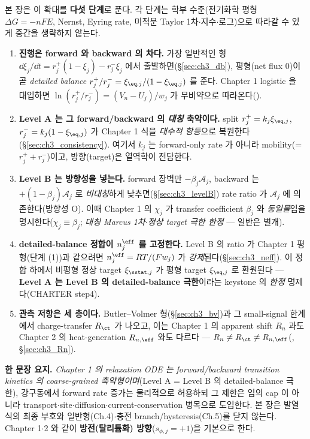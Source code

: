본 장은 이 확대를 \textbf{다섯 단계}로 푼다. 각 단계는 학부 수준(전기화학 평형 $\Delta G=-nF E$, Nernst,
Eyring rate, 미적분 Taylor 1차$\cdot$지수$\cdot$로그)으로 따라갈 수 있게 중간을 생략하지 않는다.
\begin{enumerate}[label=\textbf{(\arabic*)},leftmargin=2.2em]
\item \textbf{진행은 forward 와 backward 의 차다.} 가장 일반적인 형 $\dd\xi_j/\dd t=r_j^+(1-\xi_j)-r_j^-\xi_j$
  에서 출발하면(\S\ref{sec:ch3_db}), 평형(net flux $0$)이 곧 \emph{detailed balance} $r_j^+/r_j^-=\xi_{\eq,j}/(1-\xi_{\eq,j})$
  를 준다. Chapter 1 logistic 을 대입하면 $\ln(r_j^+/r_j^-)=(V_n-U_j)/w_j$ 가 무비약으로 따라온다().
\item \textbf{Level A 는 그 forward/backward 의 \emph{대칭} 축약이다.} split $r_j^+=k_j\xi_{\eq,j}$,
  $r_j^-=k_j(1-\xi_{\eq,j})$ 가 Chapter 1 식을 \emph{대수적 항등}으로 복원한다(\S\ref{sec:ch3_consistency}).
  여기서 $k_j$ 는 forward-only rate 가 아니라 mobility(=$r_j^++r_j^-$)이고, 방향(target)은 열역학이 전담한다.
\item \textbf{Level B 는 방향성을 넣는다.} forward 장벽만 $-\beta_j\mathcal A_j$, backward 는 $+(1-\beta_j)\mathcal A_j$
  로 \emph{비대칭}하게 낮추면(\S\ref{sec:ch3_levelB}) rate ratio 가 $\mathcal A_j$ 에 의존한다(방향성 O). 이때
  Chapter 1 의 $\chi_j$ 가 transfer coefficient $\beta_j$ 와 \emph{동일물}임을 명시한다($\chi_j\equiv\beta_j$; \emph{대칭 Marcus 1차$\cdot$정상 target 극한 한정} — 일반은 별개).
\item \textbf{detailed-balance 정합이 $n_j^{\eff}$ 를 고정한다.} Level B 의 ratio 가 Chapter 1 평형(단계 (1))과
  같으려면 $n_j^{\eff}=RT/(Fw_j)$ 가 \emph{강제}된다(\S\ref{sec:ch3_neff}). 이 정합 하에서 비평형 정상 target
  $\xi_{\sstat,j}$ 가 평형 target $\xi_{\eq,j}$ 로 환원된다 — \textbf{Level A 는 Level B 의 detailed-balance
  극한}이라는 keystone 의 \emph{한정} 명제다(CHARTER step4).
\item \textbf{관측 저항은 세 층이다.} Butler--Volmer 형(\S\ref{sec:ch3_bv})과 그 small-signal 한계에서
  charge-transfer $R_\ct$ 가 나오고, 이는 Chapter 1 의 apparent shift $R_n$ 과도 Chapter 2 의 heat-generation
  $R_{n,\eff}$ 와도 다르다 — $R_n\ne R_\ct\ne R_{n,\eff}$(, \S\ref{sec:ch3_Rn}).
\end{enumerate}

\noindent\textbf{한 문장 요지.} \emph{Chapter 1 의 relaxation ODE 는 forward/backward transition kinetics 의
coarse-grained 축약형이며}(Level A = Level B 의 detailed-balance 극한), 강구동에서 forward rate 증가는
물리적으로 허용하되 그 제한은 임의 cap 이 아니라 transport$\cdot$site$\cdot$diffusion$\cdot$current-conservation
병목으로 도입한다. 본 장은 발열식의 최종 부호와 일반형(Ch.4)$\cdot$충전 branch/hysteresis(Ch.5)를 닫지 않는다.
Chapter 1$\cdot$2 와 같이 \textbf{방전(탈리튬화) 방향}($s_{\phi,j}=+1$)을 기본으로 한다.

